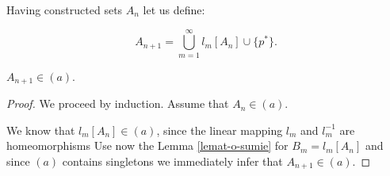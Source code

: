 \documentclass[12pt]{amsart}
\theoremstyle{plain}
\theoremstyle{definition}
\theoremstyle{remark}
\newcommand{\aideal}{\mathit{(a)}}
\newcommand{\aidealprime}{\mathit{(a^\prime)}}
\begin{document}
\smallskip
%
%
Having constructed sets $A_n$ let us define:

\[ A_{n + 1} = \bigcup_{m=1}^{\infty} l_m[A_n] \cup \lbrace p^* \rbrace.
\]

 $A_{n+1} \in \aideal$.
\begin{proof}
  We proceed by induction. Assume that 
$A_n \in \aideal$.

We know that $l_m[A_n] \in \aideal$, since the linear mapping $l_m$
and $l_m^{-1}$ are homeomorphisms
Use now the Lemma \ref{lemat-o-sumie} for
$B_m = l_m[A_n]$ and since $\aideal$ contains singletons
we immediately infer that $A_{n+1} \in \aideal$.
\end{proof}
\end{document}
